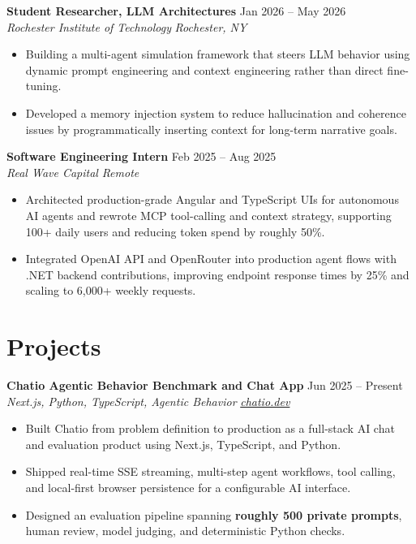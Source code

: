 \documentclass[10pt,letterpaper]{article}
\newif\ifresumeFirstRole
\newcommand{\resumeRole}[4]{%
  \ifresumeFirstRole
    \global\resumeFirstRolefalse
  \else
    \vspace{0pt plus 1fill}%
  \fi
  \textbf{#1} \hfill #2\\
  \textit{#3} \hfill \textit{#4}
}
\begin{document}
\resumeRole{Student Researcher, LLM Architectures}{Jan 2026 -- May 2026}{Rochester Institute of Technology}{Rochester, NY}
\begin{itemize}
  \item Building a multi-agent simulation framework that steers LLM behavior using dynamic prompt engineering and context engineering rather than direct fine-tuning.
  \item Developed a memory injection system to reduce hallucination and coherence issues by programmatically inserting context for long-term narrative goals.
\end{itemize}

\resumeRole{Software Engineering Intern}{Feb 2025 -- Aug 2025}{Real Wave Capital}{Remote}
\begin{itemize}
  \item Architected production-grade Angular and TypeScript UIs for autonomous AI agents and rewrote MCP tool-calling and context strategy, supporting 100+ daily users and reducing token spend by roughly 50\%.
  \item Integrated OpenAI API and OpenRouter into production agent flows with .NET backend contributions, improving endpoint response times by 25\% and scaling to 6,000+ weekly requests.
\end{itemize}

\section*{Projects}
\resumeRole{Chatio Agentic Behavior Benchmark and Chat App}{Jun 2025 -- Present}{Next.js, Python, TypeScript, Agentic Behavior}{\href{https://chatio.dev}{chatio.dev}}
\begin{itemize}
  \item Built Chatio from problem definition to production as a full-stack AI chat and evaluation product using Next.js, TypeScript, and Python.
  \item Shipped real-time SSE streaming, multi-step agent workflows, tool calling, and local-first browser persistence for a configurable AI interface.
  \item Designed an evaluation pipeline spanning \textbf{roughly 500 private prompts}, human review, model judging, and deterministic Python checks.
\end{itemize}
\end{document}
